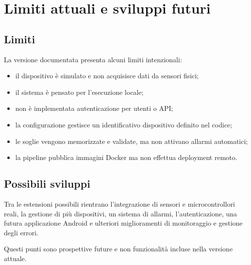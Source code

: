 \chapter{Limiti attuali e sviluppi futuri}

\section{Limiti}
La versione documentata presenta alcuni limiti intenzionali:
\begin{itemize}
    \item il dispositivo è simulato e non acquisisce dati da sensori fisici;
    \item il sistema è pensato per l'esecuzione locale;
    \item non è implementata autenticazione per utenti o API;
    \item la configurazione gestisce un identificativo dispositivo definito nel codice;
    \item le soglie vengono memorizzate e validate, ma non attivano allarmi automatici;
    \item la pipeline pubblica immagini Docker ma non effettua deployment remoto.
\end{itemize}

\section{Possibili sviluppi}
Tra le estensioni possibili rientrano l'integrazione di sensori e microcontrollori reali, la gestione di più dispositivi, un sistema di allarmi, l'autenticazione, una futura applicazione Android e ulteriori miglioramenti di monitoraggio e gestione degli errori.

Questi punti sono prospettive future e non funzionalità incluse nella versione attuale.
